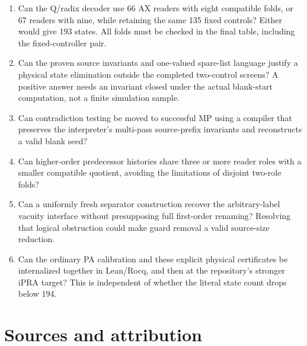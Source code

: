 \documentclass[11pt,letterpaper]{article}
\begin{document}
\begin{enumerate}
\item Can the Q/radix decoder use 66 AX readers with eight compatible
folds, or 67 readers with nine, while retaining the same 135 fixed
controls? Either would give 193 states. All folds must be checked in the
final table, including the fixed-controller pair.
\item Can the proven source invariants and one-valued spare-list language
justify a physical state elimination outside the completed two-control
screens? A positive answer needs an invariant closed under the actual
blank-start computation, not a finite simulation sample.
\item Can contradiction testing be moved to successful MP using a
compiler that preserves the interpreter's multi-pass source-prefix
invariants and reconstructs a valid blank seed?
\item Can higher-order predecessor histories share three or more reader
roles with a smaller compatible quotient, avoiding the limitations of
disjoint two-role folds?
\item Can a uniformly fresh separator construction recover the
arbitrary-label vacuity interface without presupposing full
first-order renaming? Resolving that logical obstruction could make
guard removal a valid source-size reduction.
\item Can the ordinary PA calibration and these explicit physical
certificates be internalized together in Lean/Rocq, and then at the
repository's stronger iPRA target? This is independent of whether the
literal state count drops below 194.
\end{enumerate}

\section*{Sources and attribution}
\end{document}
